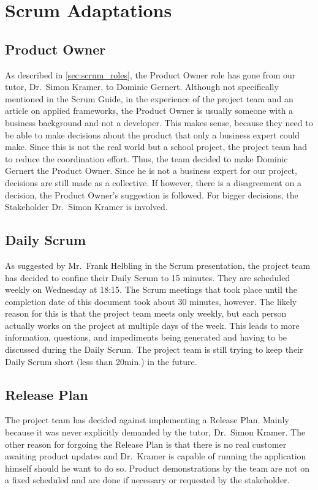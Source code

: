 \section{Scrum Adaptations}
\subsection{Product Owner}
As described in \autoref{sec:scrum_roles}, the Product Owner role has gone from our tutor, Dr.\ Simon Kramer, to Dominic Gernert. Although not specifically mentioned in the Scrum Guide\cite{scrum_guide}, in the experience
of the project team and an article on applied frameworks\cite{applied_frameworks_po}, the Product Owner is usually someone with a business background and not a developer. This makes sense, because they need to be able to make decisions about the product that only a business
expert could make. Since this is not the real world but a school project, the project team had to reduce the coordination effort. Thus, the team decided to make Dominic Gernert the Product Owner. Since he is
not a business expert for our project, decisions are still made as a collective. If however, there is a disagreement on a decision, the Product Owner's suggestion is followed. For bigger decisions,
the Stakeholder Dr.\ Simon Kramer is involved.
\subsection{Daily Scrum}
As suggested by Mr.\ Frank Helbling in the Scrum presentation\cite{helbling_scrum3}, the project team has decided to confine their Daily Scrum to 15 minutes. They are scheduled weekly on Wednesday at 18:15.
The Scrum meetings that took place until the completion date of this document took about 30 minutes, however. The likely reason for this is that the project team meets only weekly,
but each person actually works on the project at multiple days of the week. This leads to more information, questions, and impediments being generated and having to be discussed during the Daily Scrum.
The project team is still trying to keep their Daily Scrum short (less than 20min.) in the future.
\subsection{Release Plan}
The project team has decided against implementing a Release Plan. Mainly because it was never explicitly demanded by the tutor, Dr.\ Simon Kramer. The other reason for forgoing the Release Plan is that
there is no real customer awaiting product updates and Dr.\ Kramer is capable of running the application himself should he want to do so. Product demonstrations by the team are not on a fixed scheduled and
are done if necessary or requested by the stakeholder.
